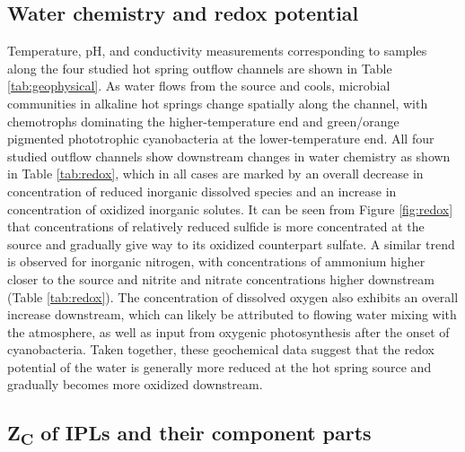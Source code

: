 \subsection{Water chemistry and redox potential} Temperature, pH, and conductivity measurements corresponding to samples along the four studied hot spring outflow channels are shown in Table \ref{tab:geophysical}. As water flows from the source and cools, microbial communities in alkaline hot springs change spatially along the channel, with chemotrophs dominating the higher-temperature end and green/orange pigmented phototrophic cyanobacteria at the lower-temperature end. All four studied outflow channels show downstream changes in water chemistry as shown in Table \ref{tab:redox}, which in all cases are marked by an overall decrease in concentration of reduced inorganic dissolved species and an increase in concentration of oxidized inorganic solutes. It can be seen from Figure \ref{fig:redox} that concentrations of relatively reduced sulfide is more concentrated at the source and gradually give way to its oxidized counterpart sulfate. A similar trend is observed for inorganic nitrogen, with concentrations of ammonium higher closer to the source and nitrite and nitrate concentrations higher downstream (Table \ref{tab:redox}). The concentration of dissolved oxygen also exhibits an overall increase downstream, which can likely be attributed to flowing water mixing with the atmosphere, as well as input from oxygenic photosynthesis after the onset of cyanobacteria. Taken together, these geochemical data suggest that the redox potential of the water is generally more reduced at the hot spring source and gradually becomes more oxidized downstream.


\subsection{Z\textsubscript{C} of IPLs and their component parts}

